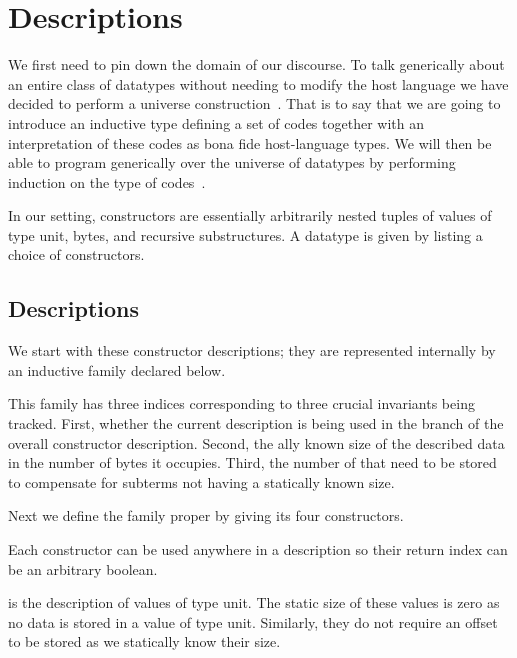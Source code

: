 \section{Descriptions}\label{sec:desc}

We first need to pin down the domain of our discourse.
%
To talk generically about an entire class of datatypes
without needing to modify the host language
we have decided to perform a universe
construction~\cite{benke-ugpp, DBLP:phd/ethos/Morris07, DBLP:conf/icfp/LohM11}.
%
That is to say that we are going to introduce an inductive type
defining a set of codes together
with an interpretation of these codes as bona fide
host-language types.
%
We will then be able to program generically over the universe of
datatypes by performing induction on the type of
codes~\cite{DBLP:conf/tphol/PfeiferR99}.

In our setting, constructors are essentially arbitrarily nested tuples of
values of type unit,
bytes,
and recursive substructures.
%
A datatype is given by listing a choice of constructors.

\subsection{Descriptions}

We start with these constructor descriptions;
they are represented internally by an inductive family 
declared below.


This family has three indices corresponding to three crucial
invariants being tracked.
%
First, whether the current description is being used in the
 branch of the overall constructor description.
%
Second, the ally known size of the described data
in the number of bytes it occupies.
%
Third, the number of  that need to be stored to
compensate for subterms not having a statically known size.

Next we define the family proper by giving its four constructors.


Each constructor can be used anywhere in a description so their return
 index can be an arbitrary boolean.

 is the description of values of type unit. The static
size of these values is zero as no data is stored in a value of type unit.
Similarly, they do not require an offset to be stored as we statically
know their size.

